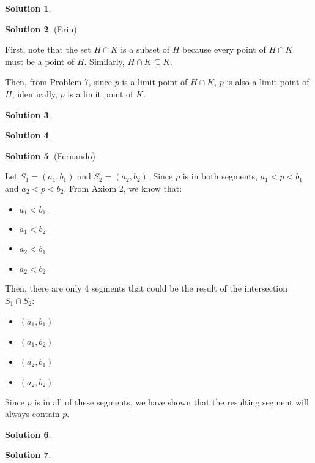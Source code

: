 \documentclass{article}
\theoremstyle{definition}
\newtheorem{solution}{Solution}
\begin{document}
\begin{solution} %
\end{solution}

\begin{solution} %
(Erin)

First, note that the set $H \cap K$ is a subset of $H$ because every point of $H \cap K$ must be a point of $H$.
Similarly, $H \cap K \subseteq K$.

Then, from Problem 7, since $p$ is a limit point of $H \cap K$, $p$ is also a limit point of $H$; identically, $p$ is a limit point of $K$.
\end{solution}

\begin{solution} %
\end{solution}

\begin{solution} %
\end{solution}

\begin{solution} %
(Fernando)

Let $S_1 = (a_1, b_1)$ and $S_2 = (a_2, b_2)$.
Since $p$ is in both segments, $a_1 < p < b_1$ and $a_2 < p < b_2$.
From Axiom 2, we know that:

\begin{itemize}
\item $a_1 < b_1$
\item $a_1 < b_2$
\item $a_2 < b_1$
\item $a_2 < b_2$
\end{itemize}

Then, there are only 4 segments that could be the result of the intersection $S_1 \cap S_2$:

\begin{itemize}
\item $(a_1, b_1)$
\item $(a_1, b_2)$
\item $(a_2, b_1)$
\item $(a_2, b_2)$
\end{itemize}

Since $p$ is in all of these segments, we have shown that the resulting segment will always contain $p$.
\end{solution}

\begin{solution} %
\end{solution}

\begin{solution} %
\end{solution}
\end{document}
